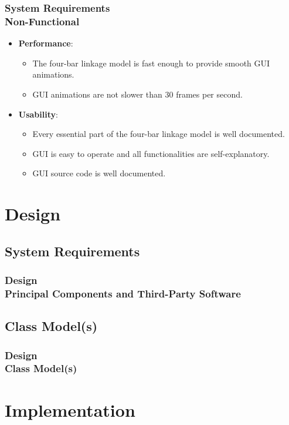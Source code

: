 \documentclass[ucs,10pt]{beamer}
\begin{document}
\begin{frame}
	\frametitle{System Requirements \\
		\small \color{rwth-blue} Non-Functional}
	\begin{itemize}
		\item \textbf{Performance}:
		\begin{itemize}
			\item The four-bar linkage model is fast enough to provide smooth GUI animations.
			\item GUI animations are not slower than 30 frames per second.
		\end{itemize}
		\item \textbf{Usability}:
		\begin{itemize}
			\item Every essential part of the four-bar linkage model is well documented.
			\item GUI is easy to operate and all functionalities are self-explanatory.
			\item GUI source code is well documented.
		\end{itemize}
	\end{itemize}
\end{frame}

\section{Design}

\subsection{System Requirements}

\begin{frame}
\frametitle{Design \\
	\small \color{rwth-blue} Principal Components and Third-Party Software}
\end{frame}

\subsection{Class Model(s)}

\begin{frame}
\frametitle{Design \\
	\small \color{rwth-blue} Class Model(s)}
\end{frame}

\section{Implementation}
\end{document}

